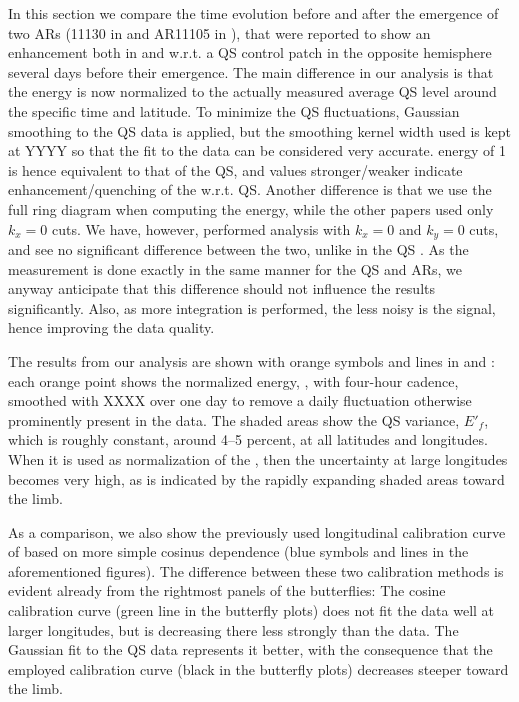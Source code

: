 \documentclass{aa}
\begin{document}
In this section we compare the \fff time evolution before and after the emergence of 
two ARs (11130 in  and AR11105 in ), that were reported to show an enhancement both in \cite{SRB16} and \cite{Waidele22} w.r.t. a QS control patch
in the opposite hemisphere several days before their emergence. The main difference in our analysis
is that the \fff energy is now normalized to the actually measured average QS level
around the specific time and latitude. To minimize
the QS fluctuations, Gaussian smoothing to the QS
data is applied, but the smoothing kernel width used is kept at YYYY so that the fit to the data can be considered very accurate.
\fff energy of 1 is hence
equivalent to that of the QS, and values stronger/weaker 
indicate enhancement/quenching of the \fff w.r.t. QS.
Another difference is that we use the
full ring diagram when computing the \fff energy, while the
other papers used only $k_x=0$ cuts. We have, however, performed
analysis with $k_x=0$ and $k_y=0$ cuts, and see no significant
difference between the two, unlike in the QS \fff. 
As the measurement is done exactly in the same
manner for the QS and ARs, we anyway anticipate
that this difference should not influence the results significantly. Also, as more integration is performed, the less noisy is the signal, hence improving the data quality. 

The results from our analysis are shown with orange symbols and lines in  and : each orange point shows the normalized \fff energy, \eft, with four-hour cadence, smoothed with XXXX over one day to remove a daily fluctuation otherwise prominently present in the data. The shaded areas show the QS variance, $E'_f$, which is roughly constant, around 4--5 percent, at all latitudes and longitudes. When it is used as normalization of the \fff, then the uncertainty at large longitudes becomes very high, as is indicated by the rapidly expanding shaded areas toward the limb.

As a comparison, we also show the previously used longitudinal calibration curve of \cite{1996A&AS..117..393B} based on more simple cosinus dependence (blue symbols and lines in the aforementioned figures).
The difference between these two calibration methods is evident already from the
rightmost panels of the \fff butterflies: The cosine calibration
curve (green line in the butterfly plots) does not fit the data well at larger longitudes,
but is decreasing there less strongly than the data. 
The Gaussian fit to the QS
data represents it better, with the consequence that the
employed calibration curve (black in the butterfly plots) decreases steeper toward the
limb. 
\end{document}
